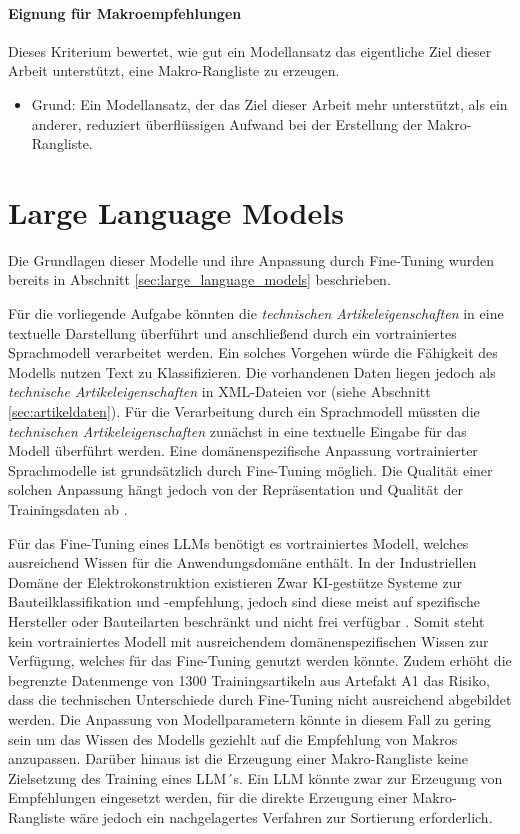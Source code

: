 \paragraph{\textbf{Eignung für Makroempfehlungen}} 
Dieses Kriterium bewertet, wie gut ein Modellansatz das eigentliche Ziel dieser Arbeit unterstützt, eine Makro-Rangliste zu erzeugen. 
\begin{itemize}
    \item Grund: Ein Modellansatz, der das Ziel dieser Arbeit mehr unterstützt, als ein anderer, reduziert überflüssigen Aufwand bei der Erstellung der Makro-Rangliste.
\end{itemize}

\section{Large Language Models} 
\label{sec:eignung_large_language_models} 

Die Grundlagen dieser Modelle und ihre Anpassung durch Fine-Tuning wurden bereits in Abschnitt \ref{sec:large_language_models} beschrieben. 

Für die vorliegende Aufgabe könnten die \textit{technischen Artikeleigenschaften} in eine textuelle Darstellung überführt und anschließend durch ein vortrainiertes Sprachmodell verarbeitet werden. 
Ein solches Vorgehen würde die Fähigkeit des Modells nutzen Text zu Klassifizieren. Die vorhandenen Daten liegen jedoch als \textit{technische Artikeleigenschaften} in XML-Dateien vor (siehe Abschnitt \ref{sec:artikeldaten}). 
Für die Verarbeitung durch ein Sprachmodell müssten die \textit{technischen Artikeleigenschaften} zunächst in eine textuelle Eingabe für das Modell überführt werden. 
Eine domänenspezifische Anpassung vortrainierter Sprachmodelle ist grundsätzlich durch Fine-Tuning möglich. 
Die Qualität einer solchen Anpassung hängt jedoch von der Repräsentation und Qualität der Trainingsdaten ab \parencite{zhao2023llmsurvey}. 

Für das Fine-Tuning eines LLMs benötigt es vortrainiertes Modell, welches ausreichend Wissen für die Anwendungsdomäne enthält. 
In der Industriellen Domäne der Elektrokonstruktion existieren Zwar KI-gestütze Systeme zur Bauteilklassifikation und -empfehlung, jedoch sind diese meist auf spezifische Hersteller oder Bauteilarten beschränkt und 
nicht frei verfügbar \parencite{AltiumComponentSearch2026,SiemensCapitalCopilot2026}. Somit steht kein vortrainiertes Modell mit ausreichendem domänenspezifischen Wissen zur Verfügung, welches für das Fine-Tuning genutzt werden könnte.
Zudem erhöht die begrenzte Datenmenge von 1300 Trainingsartikeln aus Artefakt A1 das Risiko, dass die technischen Unterschiede durch Fine-Tuning nicht ausreichend abgebildet werden.
Die Anpassung von Modellparametern könnte in diesem Fall zu gering sein um das Wissen des Modells geziehlt auf die Empfehlung von Makros anzupassen\parencite{hastie2009elements,zhao2023llmsurvey}. 
Darüber hinaus ist die Erzeugung einer Makro-Rangliste keine Zielsetzung des Training eines LLM´s. 
Ein LLM könnte zwar zur Erzeugung von Empfehlungen eingesetzt werden, für die direkte Erzeugung einer Makro-Rangliste wäre jedoch ein nachgelagertes Verfahren zur Sortierung erforderlich.

